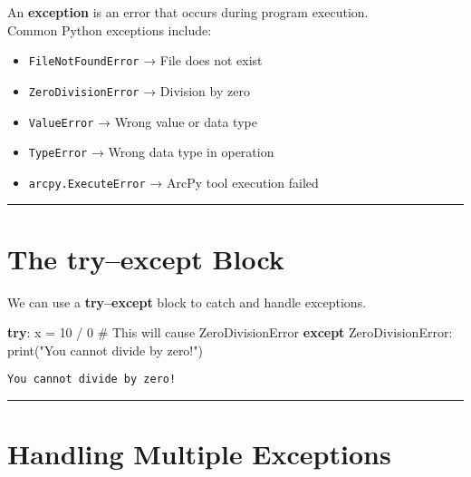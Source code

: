 \documentclass[
  11pt,
  letterpaper,
]{book}
\newenvironment{Shaded}{\begin{snugshade}}{\end{snugshade}}
\newcommand{\BuiltInTok}[1]{\textcolor[rgb]{0.00,0.23,0.31}{#1}}
\newcommand{\CommentTok}[1]{\textcolor[rgb]{0.37,0.37,0.37}{#1}}
\newcommand{\ControlFlowTok}[1]{\textcolor[rgb]{0.00,0.23,0.31}{\textbf{#1}}}
\newcommand{\DecValTok}[1]{\textcolor[rgb]{0.68,0.00,0.00}{#1}}
\newcommand{\NormalTok}[1]{\textcolor[rgb]{0.00,0.23,0.31}{#1}}
\newcommand{\OperatorTok}[1]{\textcolor[rgb]{0.37,0.37,0.37}{#1}}
\newcommand{\PreprocessorTok}[1]{\textcolor[rgb]{0.68,0.00,0.00}{#1}}
\newcommand{\StringTok}[1]{\textcolor[rgb]{0.13,0.47,0.30}{#1}}
\providecommand{\tightlist}{%
  \setlength{\itemsep}{0pt}\setlength{\parskip}{0pt}}
\begin{document}
An \textbf{exception} is an error that occurs during program
execution.\\
Common Python exceptions include:

\begin{itemize}
\tightlist
\item
  \texttt{FileNotFoundError} → File does not exist\\
\item
  \texttt{ZeroDivisionError} → Division by zero\\
\item
  \texttt{ValueError} → Wrong value or data type\\
\item
  \texttt{TypeError} → Wrong data type in operation\\
\item
  \texttt{arcpy.ExecuteError} → ArcPy tool execution failed
\end{itemize}

\begin{center}\rule{0.5\linewidth}{0.5pt}\end{center}

\section{The try--except Block}\label{the-tryexcept-block}

We can use a \textbf{try--except} block to catch and handle exceptions.

\begin{Shaded}
\begin{Highlighting}[]
\ControlFlowTok{try}\NormalTok{:}
\NormalTok{    x }\OperatorTok{=} \DecValTok{10} \OperatorTok{/} \DecValTok{0}   \CommentTok{\# This will cause ZeroDivisionError}
\ControlFlowTok{except} \PreprocessorTok{ZeroDivisionError}\NormalTok{:}
    \BuiltInTok{print}\NormalTok{(}\StringTok{"You cannot divide by zero!"}\NormalTok{)}
\end{Highlighting}
\end{Shaded}

\begin{verbatim}
You cannot divide by zero!
\end{verbatim}

\begin{center}\rule{0.5\linewidth}{0.5pt}\end{center}

\section{Handling Multiple
Exceptions}\label{handling-multiple-exceptions}
\end{document}
